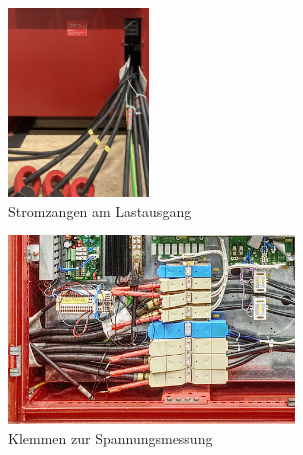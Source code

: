\begin{figure}
    \centering
    \begin{subfigure}[t]{.3\textwidth}
         \centering
         \includegraphics[height=5cm]{Bilder/Stromzangen.png}
         \caption{Stromzangen am Lastausgang}
         \label{fig:Umformer_Stromzangen}
     \end{subfigure}\hfill%
    \begin{subfigure}[t]{.4\textwidth}
          \centering
          \includegraphics[height=5cm]{Bilder/Klemmen.png}
          \caption{Klemmen zur Spannungsmessung}
          \label{fig:Umformer_vorne}
     \end{subfigure}\hfill%
     \begin{subfigure}[t]{.2\textwidth}
          \centering

\end{subfigure}
\end{figure}
